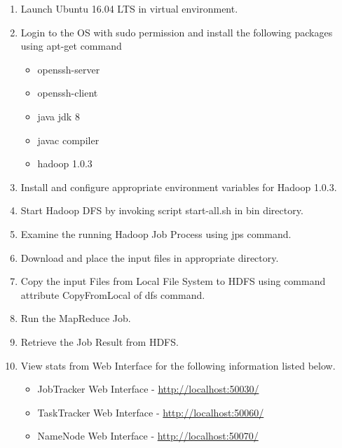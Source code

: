 \documentclass[a4paper,10pt]{article}
\begin{document}
\begin{enumerate}
	\item Launch Ubuntu 16.04 LTS in virtual environment.
	\item Login to the OS with sudo permission and install the following packages using apt-get command
	\begin{itemize}
		\item openssh-server
		\item openssh-client
		\item java jdk 8
		\item javac compiler
        \item hadoop 1.0.3
	\end{itemize}
\pagebreak
  \item Install and configure appropriate environment variables for Hadoop 1.0.3.
  \item Start Hadoop DFS by invoking script start-all.sh in bin directory.
  \item Examine the running Hadoop Job Process using jps command.
  \item Download and place the input files in appropriate directory.
  \item Copy the input Files from Local File System to HDFS using command attribute CopyFromLocal of dfs command.
  \item Run the MapReduce Job.
  \item Retrieve the Job Result from HDFS.
  \item View stats from Web Interface for the following information listed below.
  \begin{itemize}
  	\item JobTracker Web Interface - \url{http://localhost:50030/}
  	\item TaskTracker Web Interface - \url{http://localhost:50060/}
  	\item NameNode Web Interface - \url{http://localhost:50070/} 	
  \end{itemize}
  
\end{enumerate}
\end{document}
